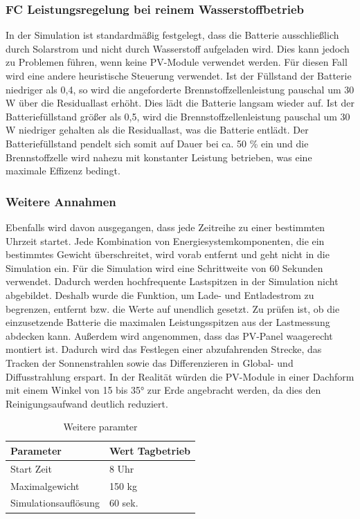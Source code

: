 \subsubsection{FC Leistungsregelung bei reinem Wasserstoffbetrieb}
In der Simulation ist standardmäßig festgelegt, dass die Batterie ausschließlich durch Solarstrom und nicht durch Wasserstoff aufgeladen wird. Dies kann jedoch zu Problemen führen, wenn keine PV-Module verwendet werden. Für diesen Fall wird eine andere heuristische Steuerung verwendet. Ist der Füllstand der Batterie niedriger als 0,4, so wird die angeforderte Brennstoffzellenleistung pauschal um 30 W über die Residuallast erhöht. Dies lädt die Batterie langsam wieder auf. Ist der Batteriefüllstand größer als 0,5, wird die Brennstoffzellenleistung pauschal um 30 W niedriger gehalten als die Residuallast, was die Batterie entlädt. Der Batteriefüllstand pendelt sich somit auf Dauer bei ca. 50 \% ein und die Brennstoffzelle wird nahezu mit konstanter Leistung betrieben, was eine maximale Effizenz bedingt.

\subsubsection{Weitere Annahmen}
Ebenfalls wird davon ausgegangen, dass jede Zeitreihe zu einer bestimmten Uhrzeit startet. Jede Kombination von Energiesystemkomponenten, die ein bestimmtes Gewicht überschreitet, wird vorab entfernt und geht nicht in die Simulation ein. Für die Simulation wird eine Schrittweite von 60 Sekunden verwendet. Dadurch werden hochfrequente Lastspitzen in der Simulation nicht abgebildet. Deshalb wurde die Funktion, um Lade- und Entladestrom zu begrenzen, entfernt bzw. die Werte auf unendlich gesetzt. Zu prüfen ist, ob die einzusetzende Batterie die maximalen Leistungsspitzen aus der Lastmessung abdecken kann. Außerdem wird angenommen, dass das PV-Panel waagerecht montiert ist. Dadurch wird das Festlegen einer abzufahrenden Strecke, das Tracken der Sonnenstrahlen sowie das Differenzieren in Global- und Diffusstrahlung erspart. In der Realität würden die PV-Module in einer Dachform mit einem Winkel von 15 bis 35° zur Erde angebracht werden, da dies den Reinigungsaufwand deutlich reduziert.

\begin{table}[h]
\centering
\begin{tabular}{|l|l|}
\hline
\textbf{Parameter} & \textbf{Wert Tagbetrieb} \\ \hline
Start Zeit & 8 Uhr \\ \hline
Maximalgewicht & 150 kg \\ \hline
Simulationsauflösung & 60 sek. \\ \hline
\end{tabular}
\caption{Weitere paramter}
\end{table}



